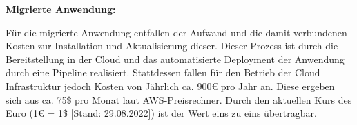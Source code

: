 






\textbf{Migrierte Anwendung:}

Für die migrierte Anwendung entfallen der Aufwand und die damit verbundenen Kosten zur Installation und Aktualisierung dieser. Dieser Prozess ist durch die Bereitstellung in der Cloud und das automatisierte Deployment der Anwendung durch eine Pipeline realisiert. Stattdessen fallen für den Betrieb der Cloud Infrastruktur jedoch Kosten von Jährlich ca. 900€ pro Jahr an. Diese ergeben sich aus ca. 75\$ pro Monat laut \ac{AWS}-Preisrechner. Durch den aktuellen Kurs des Euro (1€ = 1\$ [Stand: 29.08.2022]) ist der Wert eins zu eins übertragbar.

